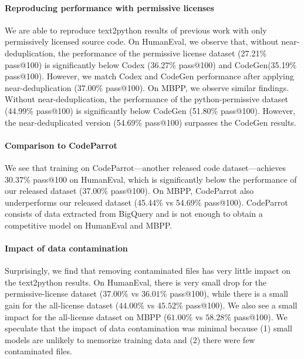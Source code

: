 \paragraph{Reproducing performance with permissive licenses} We are able to reproduce text2python results of previous work with only permissively licensed source code. On HumanEval, we observe that, without near-deduplication, the performance of the permissive license dataset (27.21\% pass@100) is significantly below Codex (36.27\% pass@100) and CodeGen(35.19\% pass@100). However, we match Codex and CodeGen performance after applying near-deduplication (37.00\% pass@100). On MBPP, we observe similar findings. Without near-deduplication, the performance of the python-permissive dataset (44.99\% pass@100) is significantly below CodeGen (51.80\% pass@100). However, the near-deduplicated version (54.69\% pass@100) surpasses the CodeGen results.  

\paragraph{Comparison to CodeParrot} We see that training on CodeParrot---another released code dataset---achieves $30.37$\% pass@100 on HumanEval, which is significantly below the performance of our released dataset (37.00\% pass@100). On MBPP, CodeParrot also underperforms our released dataset (45.44\% vs 54.69\% pass@100). CodeParrot consists of data extracted from BigQuery and is not enough to obtain a competitive model on HumanEval and MBPP. 

\paragraph{Impact of data contamination} Surprisingly, we find that removing contaminated files has very little impact on the text2python results. On HumanEval, there is very small drop for the permissive-license dataset ($37.00$\% vs $36.01$\% pass@100), while there is a small gain for the all-license dataset ($44.00$\% vs $45.52$\% pass@100). We also see a small impact for the all-license dataset on MBPP ($61.00$\% vs $58.28$\% pass@100). We speculate that the impact of data contamination was minimal because (1) small models are unlikely to memorize training data and (2) there were few contaminated files. 

